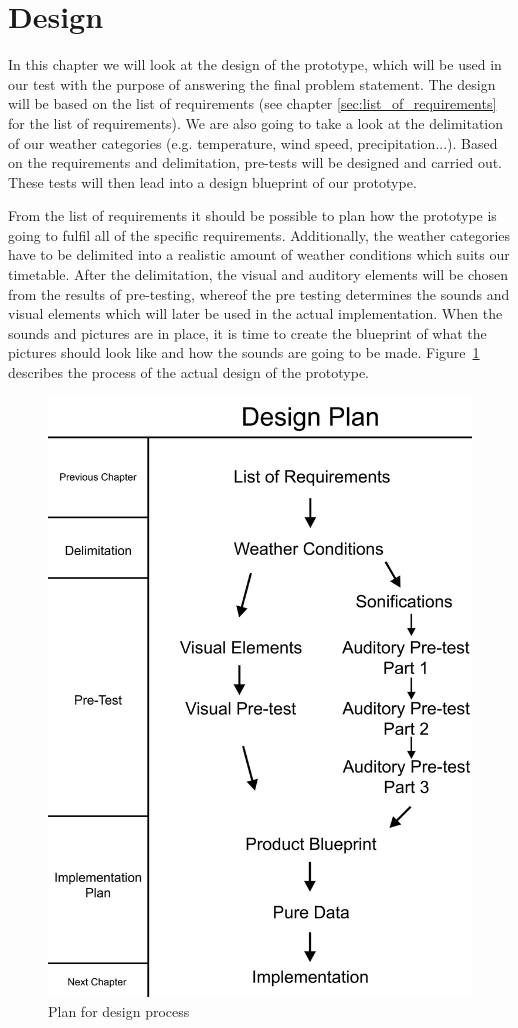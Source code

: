 
\section{Design} %
\label{sec:design}

In this chapter we will look at the design of the prototype, which will be used in our test with the purpose of answering the final problem statement. 
The design will be based on the list of requirements (see chapter \ref{sec:list_of_requirements} for the list of requirements). 
We are also going to take a look at the delimitation of our weather categories (e.g. temperature, wind speed, precipitation...). 
Based on the requirements and delimitation, pre-tests will be designed and carried out. 
These tests will then lead into a design blueprint of our prototype.

From the list of requirements it should be possible to plan how the prototype is going to fulfil all of the specific requirements. 
Additionally, the weather categories have to be delimited into a realistic amount of weather conditions which suits our timetable. 
After the delimitation, the visual and auditory elements will be chosen from the results of pre-testing, whereof the pre testing determines the sounds and visual elements which will later be used in the actual implementation. 
When the sounds and pictures are in place, it is time to create the blueprint of what the pictures should look like and how the sounds are going to be made. 
Figure~\ref{fig:design1} describes the process of the actual design of the prototype.

\begin{figure}[!htbp]
    \centering
    \includegraphics[width=.5\textwidth]{images/Design1.jpg}
    \caption{Plan for design process}
    \label{fig:design1}
\end{figure}


